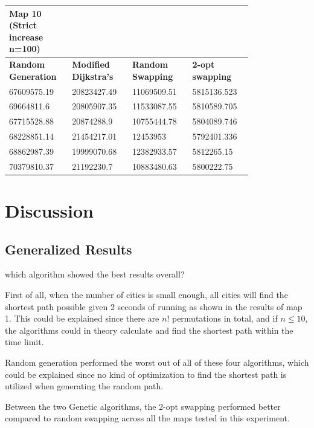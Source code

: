 \documentclass{article}
\begin{document}
\begin{table}[H]
    \centering
    \begin{tabular}{|p{0.2\linewidth}|p{0.2\linewidth}|p{0.2\linewidth}|p{0.2\linewidth}|}
    \hline
        \textbf{Map 10 (Strict increase n=100)} & ~ & ~ & ~ \\ \hline
        \textbf{Random Generation} & \textbf{Modified Dijkstra's} & \textbf{Random Swapping} & \textbf{2-opt swapping} \\ \hline
        67609575.19 & 20823427.49 & 11069509.51 & 5815136.523 \\ \hline
        69664811.6 & 20805907.35 & 11533087.55 & 5810589.705 \\ \hline
        67715528.88 & 20874288.9 & 10755444.78 & 5804089.746 \\ \hline
        68228851.14 & 21454217.01 & 12453953 & 5792401.336 \\ \hline
        68862987.39 & 19999070.68 & 12382933.57 & 5812265.15 \\ \hline
        70379810.37 & 21192230.7 & 10883480.63 & 5800222.75 \\ \hline
    \end{tabular}
\end{table}



\newpage


\section{Discussion}\label{sec4}

\subsection{Generalized Results}\label{subsec1}
which algorithm showed the best results overall?

First of all, when the number of cities is small enough, all cities will find the shortest path possible given 2 seconds of running as shown in the results of map 1. This could be explained since there are $n!$ permutations in total, and if $n\leq 10$, the algorithms could in theory calculate and find the shortest path within the time limit.

Random generation performed the worst out of all of these four algorithms, which could be explained since no kind of optimization to find the shortest path is utilized when generating the random path. 

Between the two Genetic algorithms, the 2-opt swapping performed better compared to random swapping across all the maps tested in this experiment. 
\end{document}
